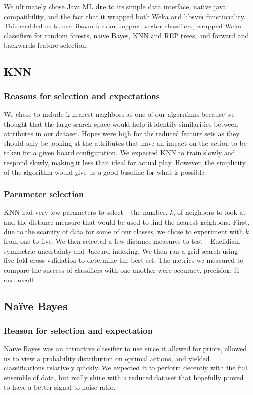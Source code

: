 \documentclass[]{article}   %
\begin{document}
We ultimately chose Java ML due to its simple data interface, native java compatibility, and the fact that it 
wrapped both Weka and libsvm functionality. This enabled us to use libsvm for our support vector classifiers, 
wrapped Weka classifiers for random forests, na\"{i}ve Bayes, KNN and REP trees, and forward and backwards feature 
selection. 

\subsection{KNN}
\subsubsection{Reasons for selection and expectations}
We chose to include k nearest neighbors as one of our algorithms because we thought that the large search space 
would help it identify similarities between attributes in our dataset. Hopes were high for the reduced feature 
sets as they should only be looking at the attributes that have an impact on the action to be taken for a given 
board configuration.  We expected KNN to train slowly and respond slowly, making it less than ideal for actual play. 
However, the simplicity of the algorithm would give us a good baseline for what is possible.

\subsubsection{Parameter selection}
KNN had very few parameters to select – the number, $k$, of neighbors to look at and the distance measure that would 
be used to find the nearest neighbors. First, due to the scarcity of data for some of our classes, we chose to 
experiment with $k$ from one to five. We then selected a few distance measures to test – Euclidian, symmetric uncertainty 
and Jaccard indexing. We then ran a grid search using five-fold cross validation to determine the best set. The metrics 
we measured to compare the success of classifiers with one another were accuracy, precision, f1 and recall. 


\subsection{Na\"{i}ve Bayes}
\subsubsection{Reason for selection and expectation}
Na\"{i}ve Bayes was an attractive classifier to use since it allowed for priors, allowed us to view a probability 
distribution on optimal actions, and yielded classifications relatively quickly. We expected it to perform decently 
with the full ensemble of data, but really shine with a reduced dataset that hopefully proved to have a better 
signal to noise ratio. 
\end{document}
